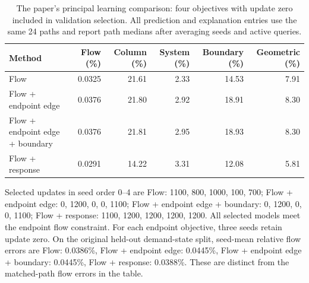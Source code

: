 \begin{table}[t]\centering\footnotesize
\caption{The paper's principal learning comparison: four objectives with update zero included in validation selection. All prediction and explanation entries use the same 24 paths and report path medians after averaging seeds and active queries.}
\label{tab:pairs-v102}
\begin{tabular}{lrrrrr}\toprule Method & Flow (\%) & Column (\%) & System (\%) & Boundary (\%) & Geometric (\%)\\\midrule
Flow & 0.0325 & 21.61 & 2.33 & 14.53 & 7.91\\
Flow + endpoint edge & 0.0376 & 21.80 & 2.92 & 18.91 & 8.30\\
Flow + endpoint edge + boundary & 0.0376 & 21.81 & 2.95 & 18.93 & 8.30\\
Flow + response & 0.0291 & 14.22 & 3.31 & 12.08 & 5.81\\
\bottomrule\end{tabular}\end{table}
Selected updates in seed order 0--4 are Flow: 1100, 800, 1000, 100, 700; Flow + endpoint edge: 0, 1200, 0, 0, 1100; Flow + endpoint edge + boundary: 0, 1200, 0, 0, 1100; Flow + response: 1100, 1200, 1200, 1200, 1200. All selected models meet the endpoint flow constraint. For each endpoint objective, three seeds retain update zero.
On the original held-out demand-state split, seed-mean relative flow errors are Flow: 0.0386\%, Flow + endpoint edge: 0.0445\%, Flow + endpoint edge + boundary: 0.0445\%, Flow + response: 0.0388\%. These are distinct from the matched-path flow errors in the table.

